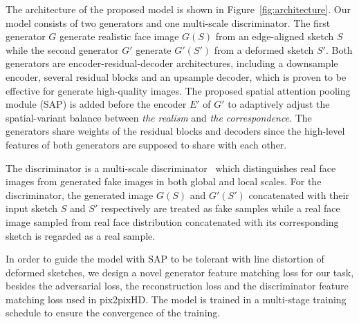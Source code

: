 % 

The architecture of the proposed model is shown in Figure~\ref{fig:architecture}.
Our model consists of two generators and one multi-scale discriminator.
The first generator $G$ generate realistic face image $G(S)$ from an edge-aligned sketch $S$ while the second generator $G'$ generate $G'(S')$ from a deformed sketch $S'$. 
Both generators are encoder-residual-decoder architectures, including a downsample encoder, several residual blocks and an upsample decoder, which is proven to be effective for generate high-quality images. 
The proposed spatial attention pooling module (SAP) is added before the encoder $E'$ of $G'$ to adaptively adjust the spatial-variant balance between \textit{the realism} and \textit{the correspondence}. 
The generators share weights of the residual blocks and decoders since the high-level features of both generators are supposed to share with each other.


%
The discriminator is a multi-scale discriminator~\cite{pix2pixHD} which distinguishes real face images from generated fake images in both global and local scales.
For the discriminator, the generated image $G(S)$ and $G'(S')$ concatenated with their input sketch $S$ and $S'$ respectively are treated as fake samples while a real face image sampled from real face distribution concatenated with its corresponding sketch is regarded as a real sample. 
%

In order to guide the model with SAP to be tolerant with line distortion of deformed sketches, we design a novel generator feature matching loss for our task, besides the adversarial loss, the reconstruction loss and the discriminator feature matching loss used in pix2pixHD. The model is trained in a multi-stage training schedule to ensure the convergence of the training.
%

